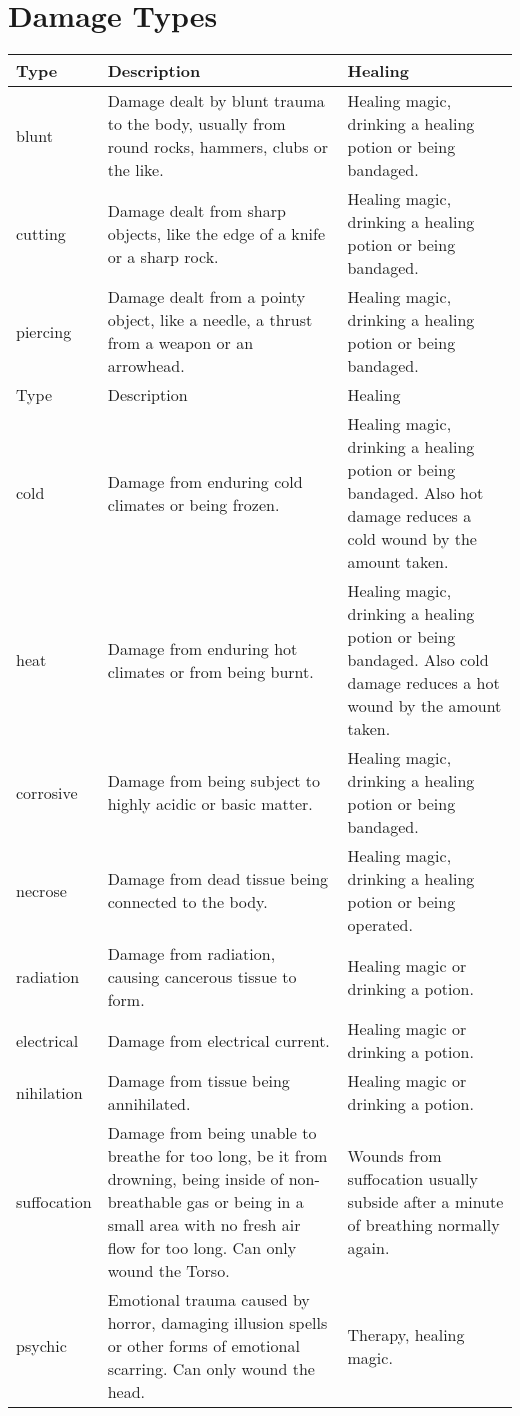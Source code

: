\chapter{Damage Types}
\begin{longtable}{l p{5cm} p{5cm}}
Type & Description & Healing \\ \hline
blunt  & Damage dealt by blunt trauma to the body, usually from round rocks, hammers, clubs or the like. & Healing magic, drinking a healing potion or being bandaged. \\
cutting & Damage dealt from sharp objects, like the edge of a knife or a sharp rock. & Healing magic, drinking a healing potion or being bandaged. \\
piercing & Damage dealt from a pointy object, like a needle, a thrust from a weapon or an arrowhead. & Healing magic, drinking a healing potion or being bandaged. \\
Type & Description & Healing \\ \hline
cold & Damage from enduring cold climates or being frozen. & Healing magic, drinking a healing potion or being bandaged. Also hot damage reduces a cold wound by the amount taken. \\
heat & Damage from enduring hot climates or from being burnt. & Healing magic, drinking a healing potion or being bandaged. Also cold damage reduces a hot wound by the amount taken. \\
corrosive & Damage from being subject to highly acidic or basic matter. & Healing magic, drinking a healing potion or being bandaged. \\
necrose & Damage from dead tissue being connected to the body. & Healing magic, drinking a healing potion or being operated. \\
radiation & Damage from radiation, causing cancerous tissue to form. & Healing magic or drinking a potion. \\
electrical & Damage from electrical current. & Healing magic or drinking a potion. \\
nihilation & Damage from tissue being annihilated. & Healing magic or drinking a potion. \\
suffocation & Damage from being unable to breathe for too long, be it from drowning, being inside of non-breathable gas or being in a small area with no fresh air flow for too long. Can only wound the Torso. & Wounds from suffocation usually subside after a minute of breathing normally again. \\
psychic & Emotional trauma caused by horror, damaging illusion spells or other forms of emotional scarring. Can only wound the head. & Therapy, healing magic. \\

\end{longtable}
